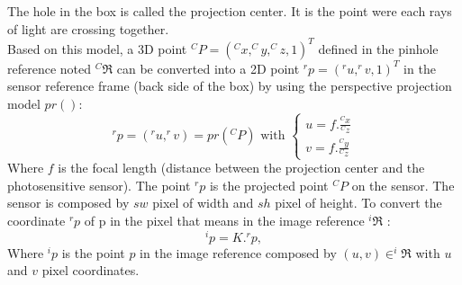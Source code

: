   
 
    
The hole in the box is called the projection center. It is the point were each rays of light are crossing together.  \\
Based on this model, a 3D point $^CP=(^Cx,^Cy,^Cz,1)^T$ defined in the pinhole reference noted $ ^C\Re$ can be converted into a 2D point  $^rp=(^ru,^rv,1)^T$ in the sensor reference frame (back side of the box) by using  the perspective projection model $pr() $: 
\begin{equation}
^rp=(^ru,^rv)= pr(^CP) \mbox{ with } \begin{cases} u= f.\frac{^Cx}{^Cz} \\  v= f.\frac{^Cy}{^Cz} 
\end{cases} 
\end{equation}
Where $f$ is the focal length (distance between the projection center and the photosensitive sensor).
The point $^rp$ is the projected point $^CP$ on the sensor. The sensor is composed by $sw$ pixel of width and $sh$  pixel of  height. To convert the coordinate $^rp$ of p in the pixel  that means in the image reference $^i\Re$ : 
\begin{equation}
^ip=K. ^rp,
\end{equation}
Where $^ip$  is the point $p$ in the image reference composed by $(u,v) \in ^i\Re$ with $u$ and $v$  pixel coordinates. 



